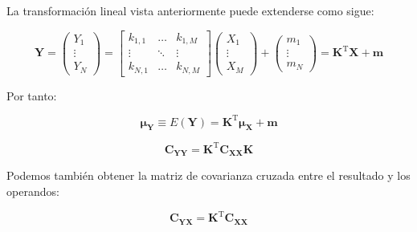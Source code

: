 \documentclass[11pt]{article}
\begin{document}
    La transformación lineal vista anteriormente puede extenderse como
sigue:

\[
\mathbf{Y} = \left( \begin{array}{c}{Y_1} \\ \vdots \\ {Y_N}\end{array}\right) = 
\left[ \begin{array}{ccc} {k_{1,1}} & \ldots & {k_{1,M}} \\ 
\vdots & \ddots & \vdots \\ 
{k_{N,1}} & \ldots & {k_{N,M}}\end{array}\right]
\left( \begin{array}{c}{X_1} \\ \vdots \\ {X_M}\end{array}\right) + \left( \begin{array}{c}{m_1} \\ \vdots \\ {m_N}\end{array}\right) = 
\mathbf{K}^\mathrm{T}\mathbf{X} + \mathbf{m}
\]

Por tanto:

\[
\boldsymbol{\mu}_{\mathbf{Y}} \equiv E(\mathbf{Y}) = 
\mathbf{K}^\mathrm{T}\boldsymbol{\mu}_{\mathbf{X}} + \mathbf{m}
\]

\[
\mathbf{C_{YY}} = \mathbf{K}^\mathrm{T}\mathbf{C_{XX}}\mathbf{K}
\]

Podemos también obtener la matriz de covarianza cruzada entre el
resultado y los operandos:

\[
\mathbf{C_{YX}} = \mathbf{K}^\mathrm{T}\mathbf{C_{XX}}
\]


    
    
    
    
\end{document}
